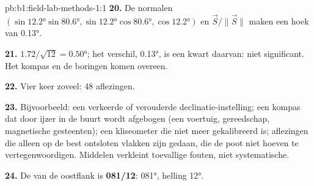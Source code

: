 \begin{solution}{pb:b1:field-lab-methods-1:1}
\textbf{20.} De normalen $(\sin\ang{12.2}\sin\ang{80.6},
\sin\ang{12.2}\cos\ang{80.6}, \cos\ang{12.2})$ en $\vec S/\|\vec S\|$ maken
een hoek van \ang{0.13}.

\textbf{21.} $1.72/\sqrt{12} = \ang{0.50}$; het verschil, \ang{0.13}, is een kwart daarvan: niet significant.
Het kompas en de boringen komen overeen.

\textbf{22.} Vier keer zoveel: 48 aflezingen.

\textbf{23.} Bijvoorbeeld: een verkeerde of verouderde declinatie-instelling; een kompas dat door ijzer in de
buurt wordt afgebogen (een voertuig, gereedschap, magnetische gesteenten); een kliseometer die niet meer
gekalibreerd is; aflezingen die alleen op de best ontsloten vlakken zijn gedaan, die de poot niet hoeven te
vertegenwoordigen. Middelen verkleint toevallige fouten, niet systematische.

\textbf{24.} De  van de oostflank is \textbf{081/12}: 
\ang{081}, helling \ang{12}.
\end{solution}

